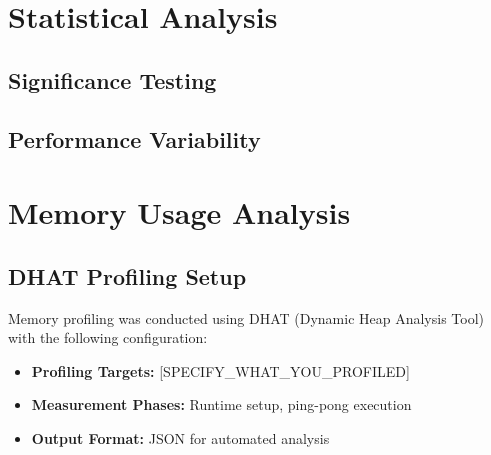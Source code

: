 \section{Statistical Analysis}
\label{sec:statistical-analysis}

\subsection{Significance Testing}


\subsection{Performance Variability}



\section{Memory Usage Analysis}
\label{sec:memory-analysis}

\subsection{DHAT Profiling Setup}

Memory profiling was conducted using DHAT (Dynamic Heap Analysis Tool) with the following configuration:
\begin{itemize}
    \item \textbf{Profiling Targets:} [SPECIFY\_WHAT\_YOU\_PROFILED]
    \item \textbf{Measurement Phases:} Runtime setup, ping-pong execution
    \item \textbf{Output Format:} JSON for automated analysis
\end{itemize}


